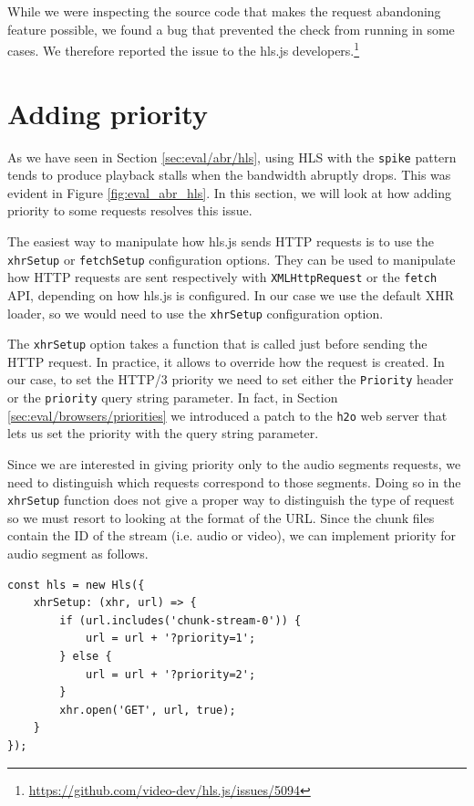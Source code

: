 While we were inspecting the source code that makes the request abandoning feature possible, we found a bug that prevented the check from running in some cases. We therefore reported the issue to the hls.js developers.\footnote{\url{https://github.com/video-dev/hls.js/issues/5094}}

\section{Adding priority}
\label{sec:improvements/priority}

As we have seen in Section \ref{sec:eval/abr/hls}, using HLS with the \texttt{spike} pattern tends to produce playback stalls when the bandwidth abruptly drops. This was evident in Figure \ref{fig:eval_abr_hls}. In this section, we will look at how adding priority to some requests resolves this issue.

The easiest way to manipulate how hls.js sends HTTP requests is to use the \texttt{xhrSetup} or \texttt{fetchSetup} configuration options. They can be used to manipulate how HTTP requests are sent respectively with \texttt{XMLHttpRequest} or the \texttt{fetch} API, depending on how hls.js is configured. In our case we use the default XHR loader, so we would need to use the \texttt{xhrSetup} configuration option.

The \texttt{xhrSetup} option takes a function that is called just before sending the HTTP request. In practice, it allows to override how the request is created. In our case, to set the HTTP/3 priority we need to set either the \texttt{Priority} header or the \texttt{priority} query string parameter. In fact, in Section \ref{sec:eval/browsers/priorities} we introduced a patch to the \texttt{h2o} web server that lets us set the priority with the query string parameter.

Since we are interested in giving priority only to the audio segments requests, we need to distinguish which requests correspond to those segments. Doing so in the \texttt{xhrSetup} function does not give a proper way to distinguish the type of request so we must resort to looking at the format of the URL. Since the chunk files contain the ID of the stream (i.e. audio or video), we can implement priority for audio segment as follows.

\begin{verbatim}
const hls = new Hls({
    xhrSetup: (xhr, url) => {
        if (url.includes('chunk-stream-0')) {
            url = url + '?priority=1';
        } else {
            url = url + '?priority=2';
        }
        xhr.open('GET', url, true);
    }
});
\end{verbatim}

